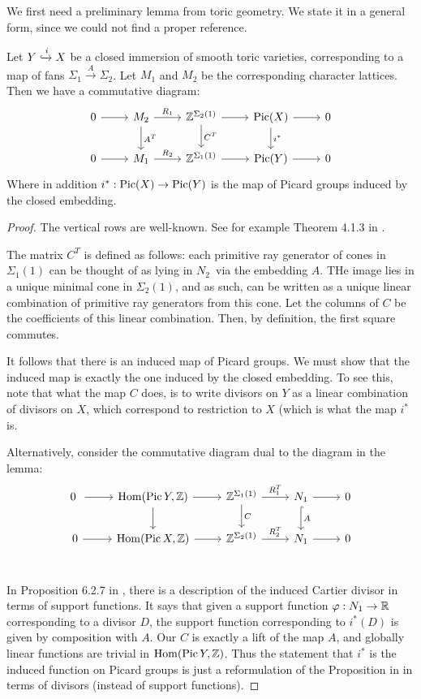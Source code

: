 We first need a preliminary lemma from toric geometry. We state it in a general form, since we could not find a proper reference.

\begin{lemma}
\label{lemma:induced}
Let $Y \xhookrightarrow{i} X$ be a closed immersion of smooth toric varieties, corresponding to a map of fans $\Sigma_1 \xrightarrow{A} \Sigma_2$. Let $M_1$ and $M_2$ be the corresponding character lattices. Then we have a commutative diagram:
\[
\begin{tikzcd}
0 \arrow{r} &  M_2 \arrow{r}{R_1} \arrow{d}{A^T} & \Z^{\Sigma_2(1)} \arrow{d}{C^T} \arrow{r} & \Pic(X)  \arrow{d}{i^\ast} \arrow{r} & 0\\
0 \arrow{r} &  M_1 \arrow{r}{R_2} & \Z^{\Sigma_1(1)} \arrow{r} & \Pic(Y) \arrow{r} & 0
\end{tikzcd}
\]
Where in addition $i^\ast : \operatorname{Pic}(X) \to \operatorname{Pic}(Y)$ is the map of Picard groups induced by the closed embedding.
\end{lemma}
\begin{proof}
The vertical rows are well-known. See for example Theorem 4.1.3 in \cite{cox_toric}.

The matrix $C^T$ is defined as follows: each primitive ray generator of cones in $\Sigma_1(1)$  can be thought of as lying in $N_2$ via the embedding $A$. THe image lies in a unique minimal cone in $\Sigma_2(1)$, and as such, can be written as a unique linear combination of primitive ray generators from this cone. Let the columns of $C$ be the coefficients of this linear combination. Then, by definition, the first square commutes.

It follows that there is an induced map of Picard groups. We must show that the induced map is exactly the one induced by the closed embedding. To see this, note that what the  map $C$ does, is to write divisors on $Y$ as a linear combination of divisors on $X$, which correspond to restriction to $X$ (which is what the map $i^\ast$ is.

Alternatively, consider the commutative diagram dual to the diagram in the lemma:
\[
\begin{tikzcd}
0 \ar{r} & \Hom(\Pic Y,\Z) \arrow{r} \arrow{d} & \Z^{\Sigma_1(1)} \arrow{r}{R_1^T} \arrow{d}{C} & N_1 \arrow{r} \arrow[hookrightarrow]{d}{A} & 0 \\
0 \ar{r} & \Hom(\Pic X,\Z) \arrow{r} & \Z^{\Sigma_2(1)} \arrow{r}{R_2^T} & N_1 \arrow{r} & 0 \\
\end{tikzcd}
\]

In Proposition 6.2.7 in \cite{cox_toric}, there is a description of the induced Cartier divisor in terms of support functions. It says that given a support function $\varphi:N_1 \to \mathbb{R}$ corresponding to a divisor $D$,  the support function corresponding to $i^\ast(D)$ is given by composition with $A$. Our $C$ is exactly a lift of the map $A$, and globally linear functions are trivial in $\operatorname{Hom}(\operatorname{Pic} Y,\mathbb{Z})$. Thus the statement that $i^\ast$ is the induced function on Picard groups is just a reformulation of the Proposition in \cite{cox_toric} in terms of divisors (instead of support functions).
\end{proof}


